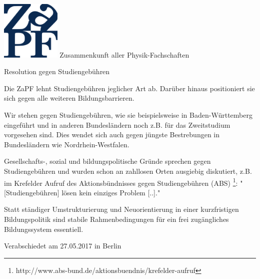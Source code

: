 \documentclass[DIV=calc]{scrartcl}
\begin{document}
    \hspace{0.87\textwidth}
    \begin{minipage}{120pt}
        \vspace{-1.8cm}
        \includegraphics[width=80pt]{logo.pdf}
        \centering
        \small Zusammenkunft aller Physik-Fachschaften
    \end{minipage}
    \begin{center}
        \huge{Resolution gegen Studiengebühren} \\
        \normalsize
    \end{center}
    \vspace{1cm}

Die ZaPF lehnt Studiengebühren jeglicher Art ab. Darüber hinaus positioniert sie sich gegen alle weiteren Bildungsbarrieren.

 Wir stehen gegen Studiengebühren, wie sie beispielsweise in Baden-Württemberg eingeführt und in anderen Bundesländern noch z.B. für das Zweitstudium vorgesehen sind. Dies wendet sich auch gegen jüngste Bestrebungen in Bundesländern wie Nordrhein-Westfalen.

 Gesellschafts-, sozial und bildungspolitische Gründe sprechen gegen Studiengebühren und wurden schon an zahllosen Orten ausgiebig diskutiert, z.B. im Krefelder Aufruf des Aktionsbündnisses gegen Studiengebühren (ABS) \footnote{http://www.abs-bund.de/aktionsbuendnis/krefelder-aufruf}: " [Studiengebühren] lösen kein einziges Problem [..]."

 Statt ständiger Umstrukturierung und Neuorientierung in einer kurzfristigen Bildungspolitik sind stabile Rahmenbedingungen 
 für ein frei zugängliches Bildungssystem essentiell.
    
    \vfill
    \begin{flushright}
        Verabschiedet am 27.05.2017 in Berlin
    \end{flushright}
    
\end{document}
